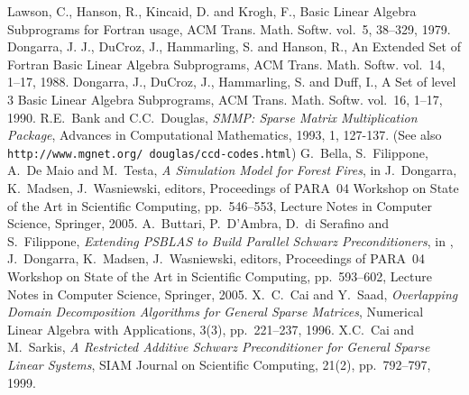 \documentclass[10pt,a4paper,twoside]{article}
\begin{document}


\begingroup
  \renewcommand*{\thepage}{toc}
  \setcounter{page}{1}    %
  \tableofcontents
\endgroup  

\newpage

\setcounter{page}{1}    %












\clearpage

\begin{thebibliography}{99}
%
Lawson, C.,  Hanson, R., Kincaid, D. and Krogh, F.,
   Basic {L}inear {A}lgebra {S}ubprograms for {F}ortran usage,
{ACM Trans. Math. Softw.} vol.~{5}, 38--329, 1979.
 Dongarra, J. J.,  DuCroz, J.,  Hammarling, S. and Hanson, R.,
An Extended Set of {F}ortran {B}asic {L}inear {A}lgebra {S}ubprograms,
{ACM Trans. Math. Softw.} vol.~{14}, 1--17, 1988.
  Dongarra, J., DuCroz, J., Hammarling, S. and Duff, I.,
A  Set of level 3 Basic Linear Algebra Subprograms,
{ACM Trans. Math. Softw.} vol.~{16}, 1--17, 1990.
R.E.~Bank and C.C.~Douglas,
{\em SMMP: Sparse Matrix Multiplication Package}, 
Advances in Computational Mathematics, 1993, 1, 127-137.
(See also {\tt http://www.mgnet.org/~douglas/ccd-codes.html}) 
%
G.~Bella, S.~Filippone, A.~De Maio and M.~Testa,
{\em A Simulation Model for Forest Fires},
in J.~Dongarra, K.~Madsen, J.~Wasniewski, editors,
Proceedings of PARA~04 Workshop on State of the Art
in Scientific Computing, pp.~546--553, Lecture Notes in Computer Science,
Springer, 2005.
%
A.~Buttari, P.~D'Ambra, D.~di Serafino and S.~Filippone,
{\em Extending PSBLAS to Build Parallel Schwarz Preconditioners},
in , J.~Dongarra, K.~Madsen, J.~Wasniewski, editors,
Proceedings of PARA~04 Workshop on State of the Art
in Scientific Computing, pp.~593--602, Lecture Notes in Computer Science,
Springer, 2005.
%
X.~C.~Cai and Y.~Saad,
{\em Overlapping Domain Decomposition Algorithms for General Sparse Matrices},
Numerical Linear Algebra with Applications, 3(3), pp.~221--237, 1996.
%
X.C.~Cai and M.~Sarkis,
{\em A Restricted Additive Schwarz Preconditioner for General Sparse Linear Systems},
SIAM Journal on Scientific Computing, 21(2), pp.~792--797, 1999.
%

\end{thebibliography}
\end{document}
